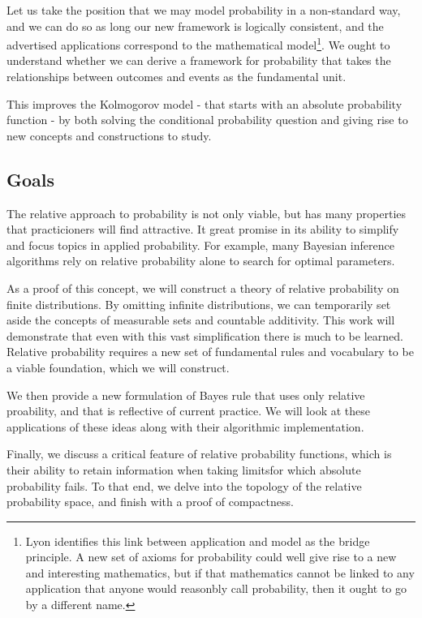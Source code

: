 \documentclass[twoside]{article}
\theoremstyle{plain}%
\theoremstyle{definition}
\theoremstyle{remark}
\begin{document}
Let us take the position that we may model probability in a non-standard way, and we can do so as long our new framework is logically consistent, and the advertised applications correspond to the mathematical model\footnote{Lyon identifies this link between application and model as the bridge principle. A new set of axioms for probability could well give rise to a new and interesting mathematics, but if that mathematics cannot be linked to any application that anyone would reasonbly call probability, then it ought to go by a different name.}. We ought to understand whether we can derive a framework for probability that takes the relationships between outcomes and events as the fundamental unit.

This improves the Kolmogorov model - that starts with an absolute probability function - by both solving the conditional probability question and giving rise to new concepts and constructions to study. 

\subsection{Goals}

The relative approach to probability is not only viable, but has many properties that practicioners will find attractive. It great promise in its ability to simplify and focus topics in applied probability. For example, many Bayesian inference algorithms rely on relative probability alone to search for optimal parameters. 

As a proof of this concept, we will construct a theory of relative probability on finite distributions. By omitting infinite distributions, we can temporarily set aside the concepts of measurable sets and countable additivity. This work will demonstrate that even with this vast simplification there is much to be learned. Relative probability requires a new set of fundamental rules and vocabulary to be a viable foundation, which we will construct.

We then provide a new formulation of Bayes rule that uses only relative proability, and that is reflective of current practice. We will look at these applications of these ideas along with their algorithmic implementation.

Finally, we discuss a critical feature of relative probability functions,
which is their ability to retain information when taking limits\textemdash for which absolute probability fails. To that end, we delve into the topology of the relative probability space, and finish with a proof of compactness.
\end{document}
